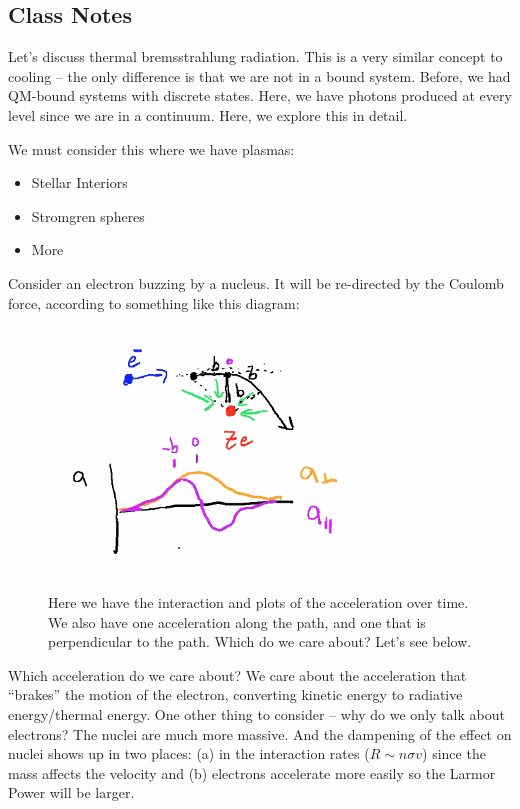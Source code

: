 \documentclass{article}
\begin{document}
\subsection{Class Notes}

Let's discuss thermal bremsstrahlung radiation. This is a very similar concept to cooling -- the only difference is that we are not in a bound system. Before, we had QM-bound systems with discrete states. Here, we have photons produced at every level since we are in a continuum. Here, we explore this in detail. 

We must consider this where we have plasmas:
\begin{itemize}
\item Stellar Interiors
\item Stromgren spheres
\item More
\end{itemize}

Consider an electron buzzing by a nucleus. It will be re-directed by the Coulomb force, according to something like this diagram:

\begin{figure}
    \centering
    \includegraphics[width=0.75\textwidth]{figures/Screen Shot 2020-10-13 at 11.28.08 AM.png}
    \caption{Here we have the interaction and plots of the acceleration over time. We also have one acceleration along the path, and one that is perpendicular to the path. Which do we care about? Let's see below. }
    \label{fig:thermbrem}
\end{figure}

Which acceleration do we care about? We care about the acceleration that ``brakes'' the motion of the electron, converting kinetic energy to radiative energy/thermal energy. One other thing to consider -- why do we only talk about electrons? The nuclei are much more massive. And the dampening of the effect on nuclei shows up in two places: (a) in the interaction rates ($R \sim n \sigma v$) since the mass affects the velocity and (b) electrons accelerate more easily so the Larmor Power will be larger. 
\end{document}

